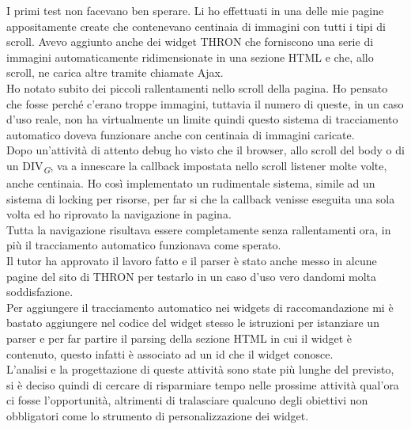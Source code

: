 \documentclass[a4paper, 12pt, twoside, openright]{book}
\newcommand{\gloss}[1]{#1\textsubscript{\textit{\tiny{G}}}}
\begin{document}
I primi test non facevano ben sperare. Li ho effettuati in una delle mie pagine appositamente create che contenevano centinaia di immagini con tutti i tipi di scroll. Avevo aggiunto anche dei widget THRON che forniscono una serie di immagini automaticamente ridimensionate in una sezione HTML e che, allo scroll, ne carica altre tramite chiamate Ajax.\\
Ho notato subito dei piccoli rallentamenti nello scroll della pagina. Ho pensato che fosse perché c'erano troppe immagini, tuttavia il numero di queste, in un caso d'uso reale, non ha virtualmente un limite quindi questo sistema di tracciamento automatico doveva funzionare anche con centinaia di immagini caricate.\\
Dopo un'attività di attento debug ho visto che il browser, allo scroll del body o di un \gloss{DIV}, va a innescare la callback impostata nello scroll listener molte volte, anche centinaia. Ho così implementato un rudimentale sistema, simile ad un sistema di locking per risorse, per far si che la callback venisse eseguita una sola volta ed ho riprovato la navigazione in pagina.\\
Tutta la navigazione  risultava essere completamente senza rallentamenti ora, in più il tracciamento automatico funzionava come sperato.\\

Il tutor ha approvato il lavoro fatto e il parser è stato anche messo in alcune pagine del sito di THRON per testarlo in un caso d'uso vero dandomi molta soddisfazione.\\
Per aggiungere il tracciamento automatico nei widgets di raccomandazione mi è bastato aggiungere nel codice del widget stesso le istruzioni per istanziare un parser e per far partire il parsing della sezione HTML in cui il widget è contenuto, questo infatti è associato ad un id che il widget conosce.\\

L'analisi e la progettazione di queste attività sono state più lunghe del previsto, si è deciso quindi di cercare di risparmiare tempo nelle prossime attività qual'ora ci fosse l'opportunità, altrimenti di tralasciare qualcuno degli obiettivi non obbligatori come lo strumento di personalizzazione dei widget.
\end{document}
